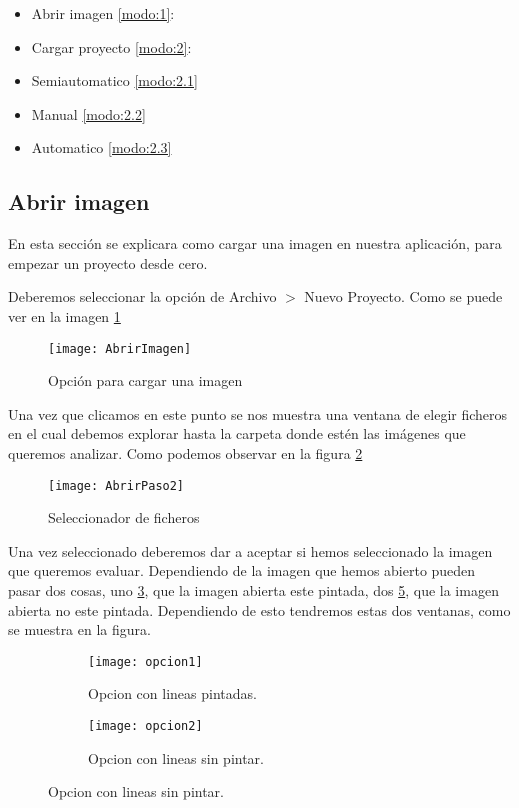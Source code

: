 \begin{itemize}
	\item Abrir imagen \ref{modo:1}:

	\item Cargar proyecto \ref{modo:2}:
	
	\item[Modo 1] Semiautomatico  \ref{modo:2.1}
	\item[Modo 2] Manual \ref{modo:2.2}
	\item[Modo 3] Automatico \ref{modo:2.3}
\end{itemize}


\label{modo:1}
\subsection{Abrir imagen}
En esta sección se explicara como cargar una imagen en nuestra aplicación, para empezar un proyecto desde cero.

Deberemos seleccionar la opción de Archivo  $>$ Nuevo Proyecto. Como se puede ver en la imagen \ref{fig:abrirPro}

\begin{figure}[h]
\centering
\texttt{[image: AbrirImagen]}
\caption{Opción para cargar una imagen}
\label{fig:abrirPro}
\end{figure}

Una vez que clicamos en este punto se nos muestra una ventana de elegir ficheros en el cual debemos explorar hasta la carpeta donde estén las imágenes que queremos analizar. Como podemos observar en la figura \ref{fig:abrirPaso2}

\begin{figure}[h]
\centering
\texttt{[image: AbrirPaso2]}
\caption{Seleccionador de ficheros}
\label{fig:abrirPaso2}
\end{figure}

Una vez seleccionado deberemos dar a aceptar si hemos seleccionado la imagen que queremos evaluar.
Dependiendo de la imagen que hemos abierto pueden pasar dos cosas, uno \ref{fig:opcion1}, que la imagen abierta este pintada, dos \ref{fig:opcion2}, que la imagen abierta no este pintada. Dependiendo de esto tendremos estas dos ventanas, como se muestra en la figura.


\begin{figure}
	\begin{subfigure}[c]{.5\linewidth}
	\centering\large \texttt{[image: opcion1]}
	\caption{Opcion con lineas pintadas.}\label{fig:opcion1}
	\end{subfigure}%
	\begin{subfigure}[c]{.5\linewidth}
	\centering\large \texttt{[image: opcion2]}
	\caption{Opcion con lineas sin pintar.}\label{fig:opcion2}
	\end{subfigure}%
\end{figure}




